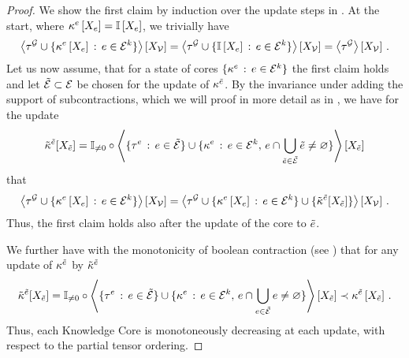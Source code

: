 \begin{proof}
    We show the first claim by induction over the update steps in .
    At the start, where $\kappa^{e}\left[X_{e}\right] = \mathbb{I}\left[X_{e}\right]$, we trivially have
    \begin{align*}
        \left\langle \tau^{\mathcal{G}} \cup \{\kappa^{e}\left[X_{e}\right] \,:\, e\in\mathcal{E}^{k}\}\right\rangle \left[ X_{\mathcal{V}} \right]
        = \left\langle \tau^{\mathcal{G}} \cup \{\mathbb{I}\left[X_{e}\right] \,:\, e\in\mathcal{E}^{k}\}\right\rangle \left[ X_{\mathcal{V}} \right]
        = \left\langle \tau^{\mathcal{G}}\right\rangle \left[ X_{\mathcal{V}} \right] \, .
    \end{align*}
    Let us now assume, that for a state of cores $\{\kappa^{e} \,:\, e\in\mathcal{E}^{k}\}$ the first claim holds and let $\tilde{\mathcal{E}}\subset\mathcal{E}$ be chosen for the update of $\kappa^{\tilde{e}}$.
    By the invariance under adding the support of subcontractions, which we will proof in more detail as  in , we have for the update
    \begin{align*}
        \tilde{\kappa}^{\tilde{e}}[X_{\tilde{e}}]
        = \mathbb{I}_{\neq0}\circ\left\langle 
            \{\tau^{e} \,:\, e\in\tilde{\mathcal{E}}\} \cup \{\kappa^{e} \,:\, e\in\mathcal{E}^{k}, \, e\cap\bigcup_{\tilde{e}\in\tilde{\mathcal{E}}}\tilde{e}\neq\varnothing  \}
        \right\rangle \left[ X_{\tilde{e}} \right]
    \end{align*}
    that
    \begin{align*}
        \left\langle \tau^{\mathcal{G}} \cup \{\kappa^{e}\left[X_{e}\right] \,:\, e\in\mathcal{E}^{k}\}\right\rangle \left[ X_{\mathcal{V}} \right]
        = \left\langle \tau^{\mathcal{G}} \cup \{\kappa^{e}\left[X_{e}\right] \,:\, e\in\mathcal{E}^{k}\} \cup \{\tilde{\kappa}^{\tilde{e}}[X_{\tilde{e}}]\}
        \right\rangle \left[ X_{\mathcal{V}} \right]  \, .
    \end{align*}
    Thus, the first claim holds also after the update of the core to $\tilde{e}$.

    We further have with the monotonicity of boolean contraction (see ) that for any update of $\kappa^{\tilde{e}}$ by $\tilde{\kappa}^{\tilde{e}}$
    \begin{align*}
        \tilde{\kappa}^{\tilde{e}}[X_{\tilde{e}}]
        = \mathbb{I}_{\neq0}\circ\left\langle 
            \{\tau^{e} \,:\, e\in\tilde{\mathcal{E}}\}
            \cup \{\kappa^{e} \,:\, e\in\mathcal{E}^{k}, \, e\cap\bigcup_{e\in\tilde{\mathcal{E}}}e\neq\varnothing\}
        \right\rangle \left[ X_{\tilde{e}} \right]
        \prec \kappa^{\tilde{e}}\left[X_{\tilde{e}}\right] \, .
    \end{align*}
    Thus, each Knowledge Core is monotoneously decreasing at each update, with respect to the partial tensor ordering.


\end{proof}
